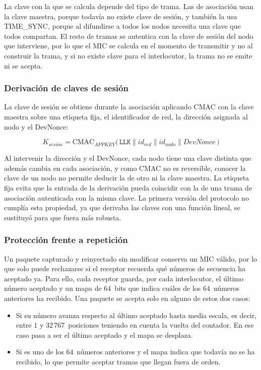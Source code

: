 La clave con la que se calcula depende del tipo de trama. Las de asociación usan la clave maestra, porque todavía no existe clave de sesión, y también la usa TIME\_SYNC, porque al difundirse a todos los nodos necesita una clave que todos compartan. El resto de tramas se autentica con la clave de sesión del nodo que interviene, por lo que el MIC se calcula en el momento de transmitir y no al construir la trama, y si no existe clave para el interlocutor, la trama no se emite ni se acepta.

\subsubsection{Derivación de claves de sesión}\label{sec:kdf}

La clave de sesión se obtiene durante la asociación aplicando CMAC con la clave maestra sobre una etiqueta fija, el identificador de red, la dirección asignada al nodo y el DevNonce:

\begin{equation}
K_{sesion} = \mathrm{CMAC}_{APPKEY}\big(\,\texttt{LLK} \parallel id_{red} \parallel id_{nodo} \parallel DevNonce\,\big)
\end{equation}

Al intervenir la dirección y el DevNonce, cada nodo tiene una clave distinta que además cambia en cada asociación, y como CMAC no es reversible, conocer la clave de un nodo no permite deducir la de otro ni la clave maestra. La etiqueta fija evita que la entrada de la derivación pueda coincidir con la de una trama de asociación autenticada con la misma clave. La primera versión del protocolo no cumplía esta propiedad, ya que derivaba las claves con una función lineal, se sustituyó para que fuera más robusta.

\subsubsection{Protección frente a repetición}\label{sec:antirepeticion}

Un paquete capturado y reinyectado sin modificar conserva un MIC válido, por lo que solo puede rechazarse si el receptor recuerda qué números de secuencia ha aceptado ya. Para ello, cada receptor guarda, por cada interlocutor, el último número aceptado y un mapa de 64~bits que indica cuáles de los 64~números anteriores ha recibido. Una paquete se acepta solo en alguno de estos dos casos:

\begin{itemize}
\item Si su número avanza respecto al último aceptado hasta media escala, es decir, entre 1 y 32\,767~posiciones teniendo en cuenta la vuelta del contador. En ese caso pasa a ser el último aceptado y el mapa se desplaza.

\item Si es uno de los 64~números anteriores y el mapa indica que todavía no se ha recibido, lo que permite aceptar tramas que llegan fuera de orden.
\end{itemize}

